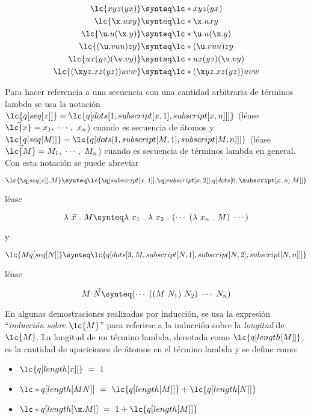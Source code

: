\begin{align*}
  \lc{x y z (y x)} & \synteq \lc*{x y z (y x)}\\
  \lc{\x.u x y} & \synteq \lc*{\x.u x y}\\
  \lc{\u.u(\x.y)} & \synteq \lc*{\u.u(\x.y)}\\
  \lc{(\u.v u u)z y} & \synteq \lc*{(\u.v u u)z y}\\
  \lc{u x(y z)(\v.v y)} & \synteq \lc*{u x(y z)(\v.v y)}\\
  \lc{(\x y z.x z(y z))u v w} & \synteq \lc*{(\x y z.x z(y z))u v w}
\end{align*}

Para hacer referencia a una secuencia con una cantidad arbitraria de términos
lambda se usa la notación
\(\lc{q[seq[x]]}=\lc{q[dots[1,subscript[x,1],subscript[x,n]]]}\) (léase
\(\vec{\lc{x}}=x_{1},\ \cdots,\ x_{n}\)) cuando es secuencia de átomos y
\(\lc{q[seq[M]]}=\lc{q[dots[1,subscript[M,1],subscript[M,n]]]}\) (léase
\(\vec{\lc{M}}=M_{1},\ \cdots,\ M_{n}\)) cuando es secuencia de términos lambda
en general. Con esta notación se puede abreviar

\[\lc{\q[seq[x]].M} \synteq
  \lc{\q[subscript[x,1]].\q[subscript[x,2]].q[dots[0,\subscript[x,n].M]]}\]

léase

\[\lambda\ \vec{x}\ .\ M \synteq \lambda\ x_{1}\ .\ \lambda\ x_{2}\ .\ (\cdots\
  (\lambda\ x_{n}\ .\ M)\ \cdots)\]

y

\[\lc{M q[seq[N]]} \synteq
  \lc{q[dots[3,M,subscript[N,1],subscript[N,2],subscript[N,n]]]}\]

léase

\[M\ \vec{N} \synteq (\cdots\ ((M\ N_{1})\ N_{2})\ \cdots\ N_{n})\]

En algunas demostraciones realizadas por inducción, se usa la expresión
``\emph{inducción sobre} \(\lc{M}\)'' para referirse a la inducción sobre la
\emph{longitud} de \(\lc{M}\). La longitud de un término lambda, denotada como
\(\lc{q[length[M]]}\), es la cantidad de apariciones de átomos en el término
lambda y se define como:

\begin{itemize}
\item \(\lc{q[length[x]]}\ =\ 1\)
\item \(\lc*{q[length[M N]]}\ =\ \lc{q[length[M]]} + \lc{q[length[N]]}\)
\item \(\lc*{q[length[\x.M]]}\ =\ 1 + \lc{q[length[M]]}\)
\end{itemize}

